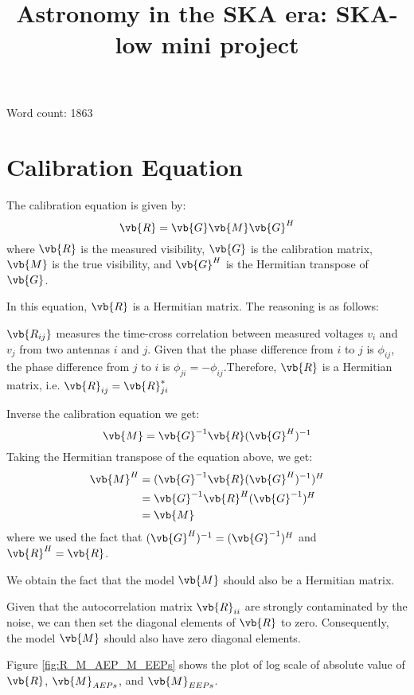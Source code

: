 \documentclass[10pt,a4paper,twocolumn]{paper}
\newcommand{\topic}{Astronomy in the SKA era: SKA-low mini project}
\begin{document}
\title{\topic}
\begin{titlepage}
    \maketitle
    Word count: 1863
\end{titlepage}

\newpage

\section{Calibration Equation}
The calibration equation is given by:
\begin{equation}
    \vb{R} = \vb{G}\vb{M}\vb{G}^{H}
\end{equation}
where $\vb{R}$ is the measured visibility, $\vb{G}$ is the calibration matrix, $\vb{M}$ is the true visibility, and $\vb{G}^{H}$ is the Hermitian transpose of $\vb{G}$. 

In this equation, $\vb{R}$ is a Hermitian matrix. The reasoning is as follows:

$\vb{R_{ij}}$ measures the time-cross correlation between measured voltages $v_i$ and $v_j$ from two antennas $i$ and $j$. Given that the phase difference from $i$ to $j$ is $\phi_{ij}$, the phase difference from $j$ to $i$ is $\phi_{ji} = -\phi_{ij}$.Therefore, $\vb{R}$ is a Hermitian matrix, i.e. $\vb{R}_{ij} = \vb{R}_{ji}^{*}$

Inverse the calibration equation we get:
\begin{equation}
    \vb{M} = \vb{G}^{-1}\vb{R}(\vb{G}^{H})^{-1}
\end{equation}
Taking the Hermitian transpose of the equation above, we get:
\begin{align}
    \vb{M}^{H} &= (\vb{G}^{-1}\vb{R}(\vb{G}^{H})^{-1})^{H}\\
    &= \vb{G}^{-1}\vb{R}^{H}(\vb{G}^{-1})^{H}\\
    &= \vb{M}
\end{align}
where we used the fact that $(\vb{G}^{H})^{-1} = (\vb{G}^{-1})^{H}$ and $\vb{R}^{H} = \vb{R}$.

We obtain the fact that the model $\vb{M}$ should also be a Hermitian matrix.

Given that the autocorrelation matrix $\vb{R}_{ii}$ are strongly contaminated by the noise, we can then set the diagonal elements of $\vb{R}$ to zero. Consequently, the model $\vb{M}$ should also have zero diagonal elements.

Figure \ref{fig:R_M_AEP_M_EEPs} shows the plot of log scale of absolute value of $\vb{R}$, $\vb{M}_{AEPs}$, and $\vb{M}_{EEPs}$.
\end{document}
